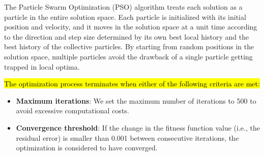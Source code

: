\documentclass[3p,authoryear,preprint,12pt]{elsarticle}
\begin{document}
The Particle Swarm Optimization (PSO) algorithm treats each solution as a particle in the entire solution space. Each particle is initialized with its initial position and velocity, and it moves in the solution space at a unit time according to the direction and step size determined by its own best local history and the best history of the collective particles. By starting from random positions in the solution space, multiple particles avoid the drawback of a single particle getting trapped in local optima. 

\hl{The optimization process terminates when either of the following criteria are met:}

\begin{itemize}
	\item \textbf{Maximum iterations}: We set the maximum number of iterations to 500 to avoid excessive computational costs.
	\item \textbf{Convergence threshold}: If the change in the fitness function value (i.e., the residual error) is smaller than 0.001 between consecutive iterations, the optimization is considered to have converged.
\end{itemize}
\end{document}
